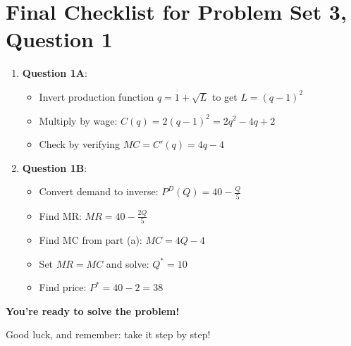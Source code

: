 \documentclass[12pt]{article}
\begin{document}
\section{Final Checklist for Problem Set 3, Question 1}

\begin{enumerate}[label=\protect\checkmark]
\item \textbf{Question 1A}:
\begin{itemize}
\item Invert production function $q = 1 + \sqrt{L}$ to get $L = (q-1)^2$
\item Multiply by wage: $C(q) = 2(q-1)^2 = 2q^2 - 4q + 2$
\item Check by verifying $MC = C'(q) = 4q - 4$
\end{itemize}

\item \textbf{Question 1B}:
\begin{itemize}
\item Convert demand to inverse: $P^D(Q) = 40 - \frac{Q}{5}$
\item Find MR: $MR = 40 - \frac{2Q}{5}$
\item Find MC from part (a): $MC = 4Q - 4$
\item Set $MR = MC$ and solve: $Q^* = 10$
\item Find price: $P^* = 40 - 2 = 38$
\end{itemize}
\end{enumerate}

\vspace{1cm}

\begin{center}
\textbf{\Large You're ready to solve the problem!}

Good luck, and remember: take it step by step!
\end{center}
\end{document}
